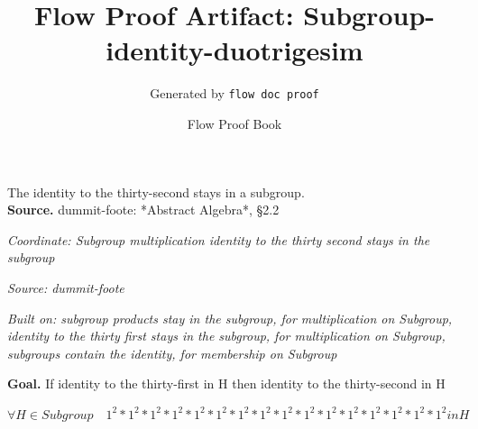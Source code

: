 \documentclass[11pt]{article}
\title{Flow Proof Artifact: Subgroup-identity-duotrigesim}
\author{Generated by \texttt{flow doc proof}}
\date{Flow Proof Book}
\theoremstyle{definition}
\begin{document}
\maketitle
The identity to the thirty-second stays in a subgroup.\\[0.5em]
\textbf{Source.} dummit-foote: *Abstract Algebra*, §2.2\\[0.5em]
\bigskip
{}\par
\smallskip\noindent\textit{Coordinate: Subgroup \cdot multiplication \cdot identity to the thirty second stays in the subgroup}\par
\smallskip\noindent\textit{Source: dummit-foote}\par
\smallskip\noindent\textit{Built on: subgroup products stay in the subgroup, for multiplication on Subgroup, identity to the thirty first stays in the subgroup, for multiplication on Subgroup, subgroups contain the identity, for membership on Subgroup}\par
\medskip
\noindent\textbf{Goal.} If identity to the thirty-first in H then identity to the thirty-second in H\par
\noindent$\displaystyle \forall H \in Subgroup\quad 1^{2} * 1^{2} * 1^{2} * 1^{2} * 1^{2} * 1^{2} * 1^{2} * 1^{2} * 1^{2} * 1^{2} * 1^{2} * 1^{2} * 1^{2} * 1^{2} * 1^{2} * 1^{2} in H$\par
\medskip
\noindent
\end{document}
